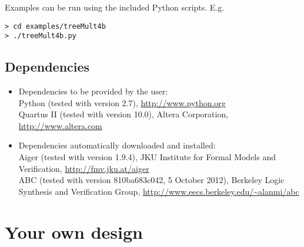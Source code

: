 \documentclass[a4paper,oneside]{memoir}
\begin{document}
Examples can be run using the included Python scripts.
E.g.
\begin{lstlisting}
> cd examples/treeMult4b
> ./treeMult4b.py
\end{lstlisting}

\section{Dependencies}
\begin{itemize}
\item Dependencies to be provided by the user:\\
Python (tested with version 2.7), \url{http://www.python.org}\\
Quartus II (tested with version 10.0), Altera Corporation, \url{http://www.altera.com}
\item Dependencies automatically downloaded and installed:\\
Aiger (tested with version 1.9.4), JKU Institute for Formal Models and Verification, \url{http://fmv.jku.at/aiger}\\
ABC (tested with version 810ba683c042, 5 October 2012), Berkeley Logic Synthesis and Verification Group, \url{http://www.eecs.berkeley.edu/\~alanmi/abc}
\end{itemize}

\clearpage
\chapter{Your own design}\label{sec:experiment}
\end{document}
